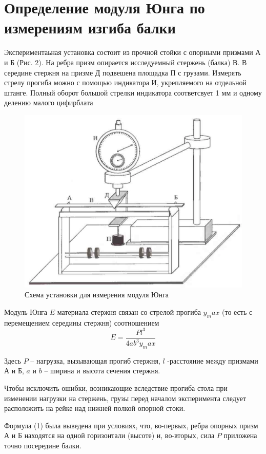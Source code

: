 \documentclass[a4paper,12pt]{article} %
\begin{document}
\section{Определение модуля Юнга по измерениям изгиба балки}
Экспериментаьная установка состоит из прочной стойки с опорными призмами А и Б (Рис. 2). На ребра призм опирается исследуемный стержень (балка) В. В середине стержня на призме Д подвешена площадка П с грузами. Измерять стрелу прогиба можно с помощью индикатора И, укрепляемого на отдельной штанге. Полный оборот большой стрелки индикатора соответсвует 1 мм и одному делению малого цифирблата
\newpage
\begin{figure}[h]
\centering
\includegraphics[scale=0.4]{2}
\caption{Схема установки для измерения модуля Юнга}
\end{figure}
Модуль Юнга $E$ материала стержня связан со стрелой прогиба $y_max$ (то есть с перемещением середины стержня) соотношением
\begin{equation}
 E = \frac{P l^3}{4ab^3y_max}
\end{equation}

Здесь $P$ -- нагрузка, вызывающая прогиб стержня, $l$ -расстояние между призмами А и Б, $a$ и $b$ -- ширина и высота сечения стержня.

Чтобы исключить ошибки, возникающие вследствие прогиба стола при изменении нагрузки на стержень, грузы перед началом эксперимента следует расположить на рейке над нижней полкой опорной стоки.

Формула (1) была выведена при условиях, что, во-первых, ребра опорных призм А и Б находятся на одной горизонтали (высоте) и, во-вторых, сила $P$ приложена точно посередине балки.
\end{document}
